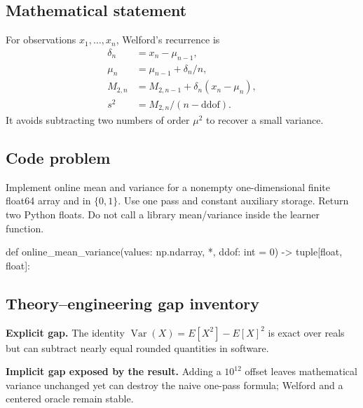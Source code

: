 
        \subsection{Mathematical statement}


For observations $x_1,\ldots,x_n$, Welford's recurrence is
\[
\begin{aligned}
\delta_n&=x_n-\mu_{n-1},\\
\mu_n&=\mu_{n-1}+\delta_n/n,\\
M_{2,n}&=M_{2,n-1}+\delta_n(x_n-\mu_n),\\
s^2&=M_{2,n}/(n-\mathrm{ddof}).
\end{aligned}
\]
It avoids subtracting two numbers of order $\mu^2$ to recover a small variance.


        \subsection{Code problem}


Implement online mean and variance for a nonempty one-dimensional finite float64
array and  in $\{0,1\}$.  Use one pass and constant auxiliary storage.
Return two Python floats.  Do not call a library mean/variance inside the learner
function.


        \begin{contractbox}
        \begin{Code}
        def online_mean_variance(values: np.ndarray, *, ddof: int = 0) -> tuple[float, float]:
        \end{Code}
        \end{contractbox}

        \subsection{Theory--engineering gap inventory}

        \begin{gapbox}
        \textbf{Explicit gap.} The identity $\operatorname{Var}(X)=E[X^2]-E[X]^2$ is exact over reals but can subtract nearly equal rounded quantities in software.

        \textbf{Implicit gap exposed by the result.} Adding a $10^{12}$ offset leaves mathematical variance unchanged yet can destroy the naive one-pass formula; Welford and a centered oracle remain stable.
        \end{gapbox}

